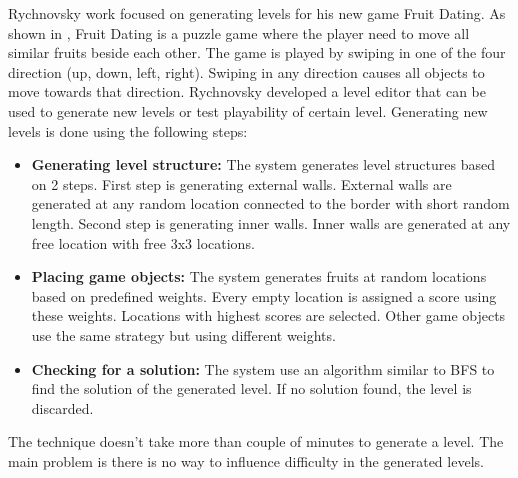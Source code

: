 Rychnovsky\cite{fruitDatingPCG} work focused on generating levels for his new game Fruit Dating. As shown in , Fruit Dating is a puzzle game where the player need to move all similar fruits beside each other. The game is played by swiping in one of the four direction (up, down, left, right). Swiping in any direction causes all objects to move towards that direction. Rychnovsky developed a level editor that can be used to generate new levels or test playability of certain level. Generating new levels is done using the following steps: 
\begin{itemize} \itemsep0pt \parskip0pt 
	\item \textbf{Generating level structure:} The system generates level structures based on 2 steps. First step is generating external walls. External walls are generated at any random location connected to the border with short random length. Second step is generating inner walls. Inner walls are generated at any free location with free 3x3 locations.
	\item \textbf{Placing game objects:} The system generates fruits at random locations based on predefined weights. Every empty location is assigned a score using these weights. Locations with highest scores are selected. Other game objects use the same strategy but using different weights.
	\item \textbf{Checking for a solution:} The system use an algorithm similar to BFS to find the solution of the generated level. If no solution found, the level is discarded.
\end{itemize}
The technique doesn't take more than couple of minutes to generate a level. The main problem is there is no way to influence difficulty in the generated levels.


